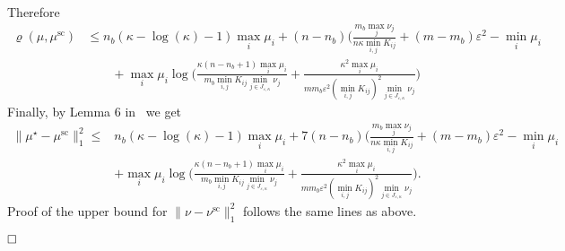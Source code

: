 \documentclass{article}
\newcommand{\norm}[1]{\|#1\|}
\begin{document}
Therefore
\begin{align*}
\varrho({\mu},{\mu}^{\text{sc}}) &\leq n_b(\kappa-\log(\kappa)-1)\max_{i} \mu_i + (n-n_b)\bigg(\frac{m_b\max_{j}\nu_j}{n\kappa\min_{i,j} K_{ij}} + (m- m_b) \varepsilon^2 - \min_{i}\mu_i\\
&\qquad + \max_{i} \mu_i\log\Big(\frac{\kappa(n-n_b+ 1)\max_{i} \mu_i}{m_b\min_{i,j}K_{ij}\min_{j \in J_{\varepsilon,\kappa}}\nu_j} + \frac{\kappa^2\max_{i} \mu_i}{mm_b\varepsilon^2(\min_{i,j}K_{ij})^2\min_{j \in J_{\varepsilon,\kappa}}\nu_j}\Big)
\end{align*}
Finally, by Lemma 6 in~\cite{altschulernips17} we get 
\begin{align*}
\norm{{\mu}^\star -{\mu}^{\text{sc}}}^2_1 \leq & n_b(\kappa-\log(\kappa)-1)\max_{i} \mu_i + 7(n-n_b)\bigg(\frac{m_b\max_{j}\nu_j}{n\kappa\min_{i,j} K_{ij}} + (m- m_b) \varepsilon^2 - \min_{i}\mu_i\\
&+ \max_{i} \mu_i\log\Big(\frac{\kappa(n-n_b+ 1)\max_{i} \mu_i}{m_b\min_{i,j}K_{ij}\min_{j \in J_{\varepsilon,\kappa}}\nu_j} + \frac{\kappa^2\max_{i} \mu_i}{mm_b\varepsilon^2(\min_{i,j}K_{ij})^2\min_{j \in J_{\varepsilon,\kappa}}\nu_j}\Big).%
\end{align*}
Proof of the upper bound for $\norm{\nu - {\nu}^{\text{sc}}}^2_1$ follows the same lines as above.

$\hfill\square$


\small


\end{document}
